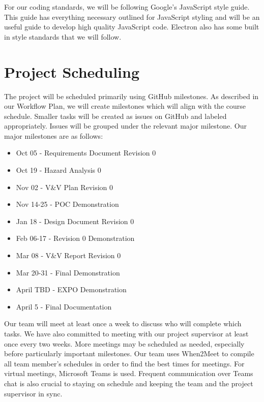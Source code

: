 \documentclass{article}
\begin{document}
For our coding standards, we will be following Google's JavaScript style guide. This guide has everything
necessary outlined for JavaScript styling and will be an useful guide to develop high quality JavaScript code. Electron also has some built in 
style standards that we will follow.

\section{Project Scheduling}

\noindent The project will be scheduled primarily using GitHub milestones. As described in our Workflow Plan, we will create milestones which will align with the course schedule. Smaller tasks will be created as issues on GitHub and labeled appropriately. Issues will be grouped under the relevant major milestone. Our major milestones are as follows:

\begin{itemize}
  \item Oct 05 - Requirements Document Revision 0
  \item Oct 19 - Hazard Analysis 0 
  \item Nov 02 - V\&V Plan Revision 0
  \item Nov 14-25 - POC Demonstration
  \item Jan 18 - Design Document Revision 0
  \item Feb 06-17 - Revision 0 Demonstration
  \item Mar 08 - V\&V Report Revision 0
  \item Mar 20-31 - Final Demonstration
  \item April TBD - EXPO Demonstration
  \item April 5 - Final Documentation \\
\end{itemize}
\noindent Our team will meet at least once a week to discuss who will complete which tasks. We have also committed to meeting with our project supervisor at least once every two weeks. More meetings may be scheduled as needed, especially before particularly important milestones. Our team uses When2Meet to compile all team member's schedules in order to find the best times for meetings. For virtual meetings, Microsoft Teams is used. Frequent communication over Teams chat is also crucial to staying on schedule and keeping the team and the project supervisor in sync. \\
\end{document}
